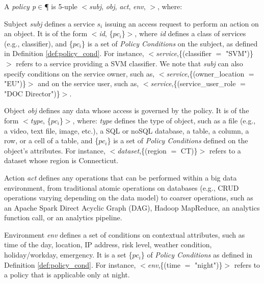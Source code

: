      \begin{definition}[Policy]\label{def:policy_rule}
        A {\it policy p}$\in$\P{} is 5-uple $<$\textit{subj}, \textit{obj}, \textit{act}, \textit{env}, \textit{\TP}$>$, where:
        \begin{description}
          \item Subject \textit{subj} defines a service $s_i$ issuing an access request to perform an action on an object. It is of the form $<$\emph{id}, \{$pc_i$\}$>$, where \emph{id} defines a class of services (e.g., classifier), and \{$pc_i$\} is a set of \emph{Policy Conditions} on the subject, as defined in Definition \ref{def:policy_cond}. For instance, $<$\emph{service},\{(classifier $=$ "SVM")\}$>$ refers to a service providing a SVM classifier. We note that \textit{subj} can also specify conditions on the service owner, such as, $<$\emph{service},\{(owner\_location $=$ "EU")\}$>$ and on the service user, such as, $<$\emph{service},\{(service\_user\_role $=$ "DOC Director")\}$>$.

          \item Object \textit{obj} defines any data whose access is governed by the policy. It is of the form $<$\emph{type}, \{$pc_i$\}$>$, where: \emph{type} defines the type of object, such as a file (e.g., a video, text file, image, etc.), a SQL or noSQL database, a table, a column, a row, or a cell of a table, and \{$pc_i$\} is a set of \emph{Policy Conditions} defined on the object's attributes. For instance, $<$\emph{dataset},\{(region $=$ CT)\}$>$ refers to a dataset whose region is Connecticut.

          \item Action \textit{act} defines any operations that can be performed within a big data environment, from traditional atomic operations on databases (e.g., CRUD operations varying depending on the data model) to coarser operations, such as an Apache Spark Direct Acyclic Graph (DAG), Hadoop MapReduce, an analytics function call, or an analytics pipeline.

          \item Environment \textit{env} defines a set of conditions on contextual attributes, such as time of the day, location, IP address, risk level, weather condition, holiday/workday, emergency. It is a set \{$pc_i$\} of \emph{Policy Conditions} as defined in Definition \ref{def:policy_cond}. For instance, $<$\emph{env},\{(time $=$ "night")\}$>$ refers to a policy that is applicable only at night.


\end{description}
\end{definition}
